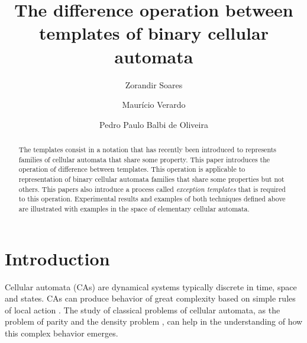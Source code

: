 \documentclass{llncs}
\begin{document}
\pagestyle{headings}  %

\title{The difference operation between templates of binary cellular automata}


\author{Zorandir Soares \and Maurício Verardo \and
Pedro Paulo Balbi de Oliveira}




\maketitle              %

\begin{abstract}
The templates consist in a notation that has recently been introduced to represents families of cellular automata that share some property. This paper introduces the operation of difference between templates. This operation is applicable to representation of binary cellular automata families that share some properties but not others. This papers also introduce a process called \textit{exception templates} that is required to this operation. Experimental results and examples of both techniques defined above are illustrated with examples in the space of elementary cellular automata.
\end{abstract}
%
\section{Introduction}
\label{sec:introducao}
Cellular automata (CAs) are dynamical systems typically discrete in time, space and states.
CAs can produce behavior of great complexity based on simple rules of local action \cite{wolfram2002}. The study of classical problems of cellular automata, as the problem of parity \cite{Betel2013} and the density problem \cite{deOliveira2014density}, can help in the understanding of how this complex behavior emerges.
\end{document}
